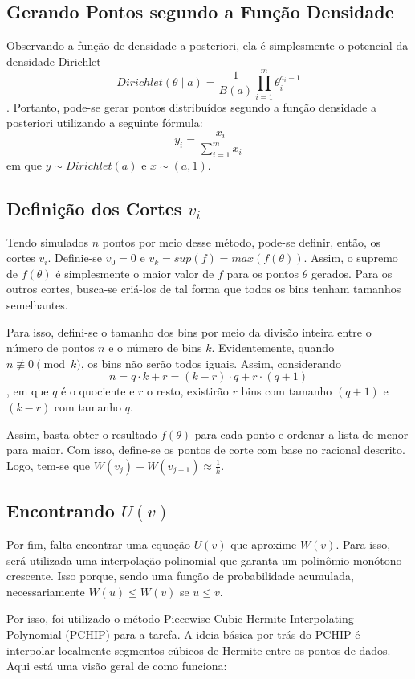 \documentclass{article}
\begin{document}
\subsection{Gerando Pontos segundo a Função Densidade}
Observando a função de densidade a posteriori, ela é simplesmente o potencial da densidade Dirichlet
\[ Dirichlet(\theta \mid a) = \frac{1}{B(a)} \prod_{i=1}^{m} \theta^{a_i - 1}_i \].
Portanto, pode-se gerar pontos distribuídos segundo a função densidade a posteriori utilizando a seguinte fórmula:
\[ y_i = \frac{x_i}{\sum_{i=1}^{m} x_i} \]
em que $y \sim Dirichlet(a)$ e $x \sim (a, 1)$.

\subsection{Definição dos Cortes $v_i$}
Tendo simulados $n$ pontos por meio desse método, pode-se definir, então, os cortes $v_i$. Definie-se $v_0 = 0$ e $v_k = sup(f) = max(f(\theta))$. Assim, o supremo de $f(\theta)$ é simplesmente o maior valor de $f$ para os pontos $\theta$ gerados. Para os outros cortes, busca-se criá-los de tal forma que todos os bins tenham tamanhos semelhantes.

Para isso, defini-se o tamanho dos bins por meio da divisão inteira entre o número de pontos $n$ e o número de bins $k$. Evidentemente, quando $n \not\equiv 0 \pmod{k}$, os bins não serão todos iguais. Assim, considerando $$n = q \cdot k + r =  (k - r) \cdot q + r \cdot (q + 1)$$, em que $q$ é o quociente e $r$ o resto, existirão $r$ bins com tamanho $(q + 1)$ e $(k - r)$ com tamanho $q$.

Assim, basta obter o resultado $f(\theta)$ para cada ponto e ordenar a lista de menor para maior. Com isso, define-se os pontos de corte com base no racional descrito. Logo, tem-se que $W(v_j) - W(v_{j-1}) \approx \frac{1}{k}$.

\subsection{Encontrando $U(v)$}
Por fim, falta encontrar uma equação $U(v)$ que aproxime $W(v)$. Para isso, será utilizada uma interpolação polinomial que garanta um polinômio monótono crescente. Isso porque, sendo uma função de probabilidade acumulada, necessariamente $W(u) \leq W(v)$ se $u \leq v$.

Por isso, foi utilizado o método Piecewise Cubic Hermite Interpolating Polynomial (PCHIP) para a tarefa. A ideia básica por trás do PCHIP é interpolar localmente segmentos cúbicos de Hermite entre os pontos de dados. Aqui está uma visão geral de como funciona:
\end{document}
